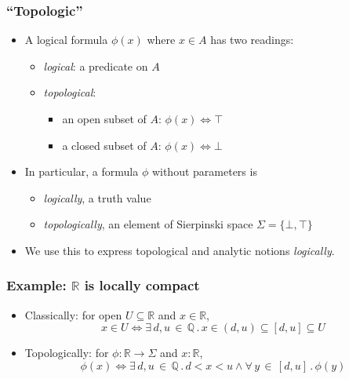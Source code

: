 \documentclass{beamer}
\newcommand{\prop}{\Sigma}
\newcommand{\QQ}{\mathbb{Q}}
\newcommand{\RR}{\mathbb{R}}
\newcommand{\xall}[3]{\forall\, #1 \,{\in}\, #2\,.\,#3}
\newcommand{\xsome}[3]{\exists\, #1 \,{\in}\, #2\,.\,#3}
\begin{document}
\begin{frame}
  \frametitle{``Topologic''}

  \begin{itemize}
  \item 
    A logical formula $\phi(x)$ where $x \in A$ has two readings:
    \begin{itemize}
    \item \emph{logical}: a predicate on $A$
    \item \emph{topological}:
      \begin{itemize}
      \item an open subset of $A$: $\phi(x) \iff \top$
      \item a closed subset of $A$: $\phi(x) \iff \bot$
      \end{itemize}
    \end{itemize}
  \item 
    In particular, a formula $\phi$ without parameters is
    \begin{itemize}
    \item \emph{logically}, a truth value
    \item \emph{topologically}, an element of Sierpinski space $\prop = \{\bot, \top\}$
    \end{itemize}
  \item 
    We use this to express topological and analytic notions
    \emph{logically}.
  \end{itemize}
\end{frame}

\begin{frame}
  \frametitle{Example: $\RR$ is locally compact}  

  \begin{itemize}
  \item Classically: for open $U \subseteq \RR$ and $x
    \in \RR$,
    \begin{equation*}
      x \in U \iff \xsome{d,u}{\QQ}{x \in (d,u) \subseteq [d,u]
        \subseteq U}
    \end{equation*}

  \item Topologically: for $\phi : \RR \to \prop$ and $x : \RR$,
    \begin{equation*}
      \phi(x) \iff
      \xsome{d,u}{\QQ}{d < x < u \land \xall{y}{[d,u]}{\phi(y)}}
    \end{equation*}
  \end{itemize}
\end{frame}
\end{document}
